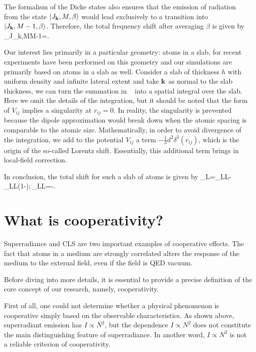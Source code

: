 The formalism of the Dicke states also ensures that the emission of radiation from the state $\left| J_{\mathbf k},M,\beta \right\rangle$ would lead exclusively to a transition into $\left| J_{\mathbf k},M-1,\beta \right\rangle$. Therefore, the total frequency shift after averaging $\beta$ is given by
\bea
\Delta\Omega_{J_\mathbf k,M\to M-1}=.
\eea

Our interest lies primarily in a particular geometry: atoms in a slab, for recent experiments have been performed on this geometry and our simulations are primarily based on atoms in a slab as well. Consider a slab of thickness $h$ with uniform density and infinite lateral extent and take $\bf k$ as normal to the slab thickness, we can turn the summation in ~ into a spatial integral over the slab. Here we omit the details of the integration, but it should be noted that the form of $V_{ij}$ implies a singularity at $r_{ij}=0$. In reality, the singularity is prevented because the dipole approximation would break down when the atomic spacing is comparable to the atomic size. Mathematically, in order to avoid divergence of the integration, we  add to the potential $V_{ij}$ a term $-\frac{1}{3}d^2\delta^3(r_{ij})$, which is the origin of the so-called Lorentz shift. Essentially, this additional term brings in local-field correction.

In conclusion, the total shift for such a slab of atoms is given by
\bea
\Delta_L=\Delta_{LL}-\Delta_{LL}\left(1-\right);\,\quad\Delta_{LL}=-.
\label{CLS_1}
\eea


\section{What is cooperativity?}

Superradiance and CLS are two important examples of cooperative effects. The fact that atoms in a medium are strongly correlated alters the response of the medium to the external field, even if the field is QED vacuum.

Before diving into more details, it is essential to provide a precise definition of the core concept of our research, namely, cooperativity.

First of all, one could not determine whether a physical phenomenon is cooperative simply based on the observable characteristics. As shown above, superradiant emission has $I\propto N^2$, but the dependence $I\propto N^2$ does not constitute the main distinguishing feature of superradiance. In another word, $I\propto N^2$ is not a reliable criterion of cooperativity.

